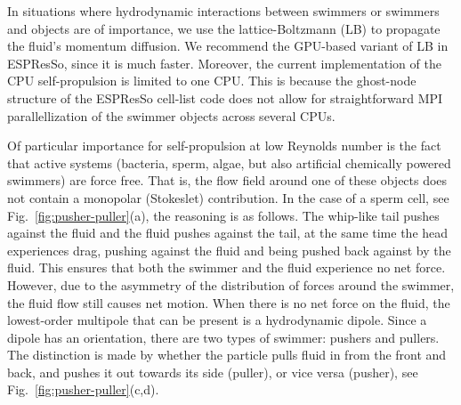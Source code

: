 \documentclass[aip,jcp,reprint,a4paper,onecolumn,amsmath]{revtex4-1}
\newcommand{\es}{\mbox{\textsf{ESPResSo}}\xspace}
\begin{document}
In situations where hydrodynamic interactions between swimmers or swimmers and
objects are of importance, we use the lattice-Boltzmann (LB) to propagate the
fluid's momentum diffusion. We recommend the GPU-based variant of LB in \es{}, 
since it is much faster. Moreover, the current implementation of the CPU 
self-propulsion is limited to one CPU. This is because the ghost-node structure 
of the \es{} cell-list code does not allow for straightforward MPI parallellization 
of the swimmer objects across several CPUs.

Of particular importance for self-propulsion at low Reynolds number is the fact
that active systems (bacteria, sperm, algae, but also artificial chemically
powered swimmers) are force free. That is, the flow field around one of these
objects does not contain a monopolar (Stokeslet) contribution. In the case of a
sperm cell, see Fig.~\ref{fig:pusher-puller}(a), the reasoning is as follows.
The whip-like tail pushes against the fluid and the fluid pushes against the
tail, at the same time the head experiences drag, pushing against the fluid and
being pushed back against by the fluid. This ensures that both the swimmer and
the fluid experience no net force. However, due to the asymmetry of the
distribution of forces around the swimmer, the fluid flow still causes net
motion. When there is no net force on the fluid, the lowest-order multipole
that can be present is a hydrodynamic dipole. Since a dipole has an
orientation, there are two types of swimmer: pushers and pullers. The
distinction is made by whether the particle pulls fluid in from the front and
back, and pushes it out towards its side (puller), or vice versa (pusher), see
Fig.~\ref{fig:pusher-puller}(c,d).
\end{document}
